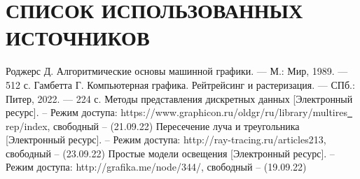 \section*{СПИСОК ИСПОЛЬЗОВАННЫХ ИСТОЧНИКОВ}

\begingroup
\renewcommand{\section}[2]{}
\begin{thebibliography}{}
	Роджерс Д. Алгоритмические основы машинной графики. — М.: Мир, 1989. — 512 с.
	Гамбетта Г. Компьютерная графика. Рейтрейсинг и растеризация. — СПб.: Питер, 2022. — 224 с.
	Методы представления дискретных данных [Электронный ресурс]. – Режим доступа:
	https://www.graphicon.ru/oldgr/ru/library/multires\underline{~} rep/index,
	свободный – (21.09.22)
	Пересечение луча и треугольника [Электронный ресурс]. – Режим доступа:
	http://ray-tracing.ru/articles213,
	свободный – (23.09.22)
	Простые модели освещения [Электронный ресурс]. – Режим доступа:
	http://grafika.me/node/344/,
	свободный – (19.09.22)
\end{thebibliography}
\endgroup

\pagebreak